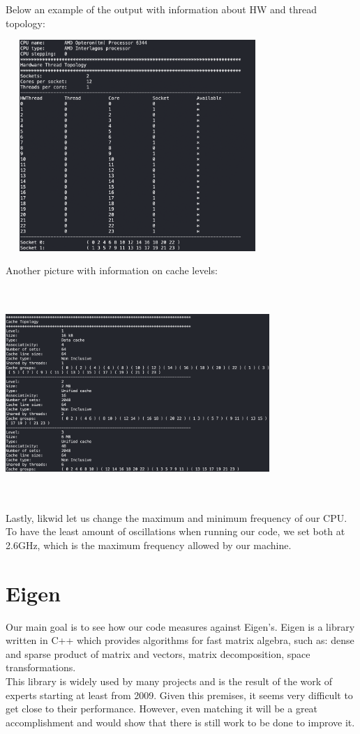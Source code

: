 \documentclass[11pt,a4paper,oneside,titlepage,openright]{book}
\begin{document}
Below an example of the output with information about HW and thread topology:\\
\begin{center}
\includegraphics[width=10cm, height=8cm]{topology_1}
\end{center}
Another picture with information on cache levels:\\
\begin{center}
\includegraphics[width=10cm, height=8cm]{topology_2}
\end{center}

Lastly, likwid let us change the maximum and minimum frequency of our CPU. To have the least amount of oscillations when running our code, we set both at 2.6GHz, which is the maximum frequency allowed by our machine.

\section{Eigen}
Our main goal is to see how our code measures against Eigen's. 
Eigen is a library written in C++ which provides algorithms for fast matrix algebra, such as: dense and sparse product of matrix and vectors, matrix decomposition, space transformations. \\This library is widely used by many projects and is the result of the work of experts starting at least from 2009. Given this premises, it seems very difficult to get close to their performance. However, even matching it will be a great accomplishment and would show that there is still work to be done to improve it. 
\end{document}
